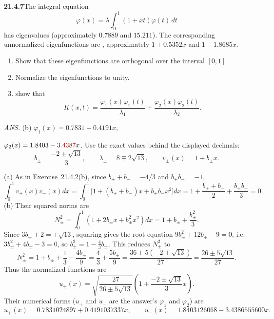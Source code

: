 \par\bigskip
\noindent\textbf{21.4.7}\quad The integral equation
\[
\varphi(x)=\lambda\int_{0}^{1}(1+xt)\varphi(t)\,dt
\]
has eigenvalues 
(approximately $0.7889$ and $15.211$). The corresponding
unnormalized eigenfunctions are
,
approximately $1+0.5352x$ and $1-1.8685x$.
\begin{enumerate}
\item[(a)] Show that these eigenfunctions are orthogonal over the
interval $[0,1]$.
\item[(b)] Normalize the eigenfunctions to unity.
\item[(c)]  show that
\[
K(x,t)=\frac{\varphi_{1}(x)\varphi_{1}(t)}{\lambda_{1}}
+\frac{\varphi_{2}(x)\varphi_{2}(t)}{\lambda_{2}}.
\]
\end{enumerate}
\par\nobreak\hfill\emph{ANS.}\enspace
(b) $\varphi_{1}(x)=0.7831+0.4191x$,\par\nobreak\hfill
$\varphi_{2}(x)=1.8403-\erratum{3.4387}x$.
\solution
Use the exact values behind the displayed decimals:
\[
b_\pm=\frac{-2\pm\sqrt{13}}3,\qquad
\lambda_\pm=8\mp2\sqrt{13},\qquad
v_\pm(x)=1+b_\pm x.
\]

(a) As in Exercise~21.4.2(b), since $b_++b_-=-4/3$ and $b_+b_-=-1$,
\[
\int_0^1v_+(x)v_-(x)dx
=\int_0^1\bigl[1+(b_++b_-)x+b_+b_-x^2\bigr]dx
=1+\frac{b_++b_-}{2}+\frac{b_+b_-}{3}=0.
\]
(b) Their squared norms are
\[
N_\pm^2=\int_0^1(1+2b_\pm x+b_\pm^2x^2)dx
=1+b_\pm+\frac{b_\pm^2}{3}.
\]
Since $3b_\pm+2=\pm\sqrt{13}$, squaring gives the root equation
$9b_\pm^2+12b_\pm-9=0$, i.e.\ $3b_\pm^2+4b_\pm-3=0$, so
$b_\pm^2=1-\frac43b_\pm$. This reduces $N_\pm^2$ to
\[
N_\pm^2=1+b_\pm+\frac13-\frac{4b_\pm}9
=\frac43+\frac{5b_\pm}{9}
=\frac{36+5(-2\pm\sqrt{13})}{27}
=\frac{26\pm5\sqrt{13}}{27}.
\]
Thus the normalized functions are
\[
\boxed{u_\pm(x)=
\sqrt{\frac{27}{26\pm5\sqrt{13}}}
\left(1+\frac{-2\pm\sqrt{13}}3x\right)}.
\]
Their numerical forms ($u_+$ and $u_-$ are the answer's $\varphi_1$
and $\varphi_2$) are
\[
u_+(x)=0.7831024897+0.4191037337x,\qquad
u_-(x)=1.8403126068-3.4386555600x.
\]


